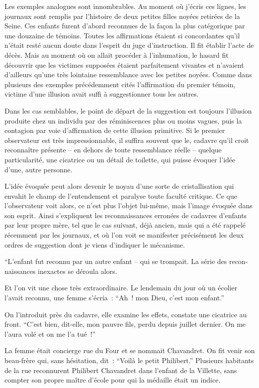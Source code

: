 \documentclass[french,twoside]{book} %
\begin{document}
Les exemples analogues sont innombrables. Au moment où j’écris ces lignes, les journaux sont remplis par l’histoire de deux petites filles noyées retirées de la Seine. Ces enfants furent d’abord reconnues de la façon la plus catégorique par une douzaine de témoins. Toutes les affirmations étaient si concordantes qu’il n’était resté aucun doute dans l’esprit du juge d’instruction. Il fit établir l’acte de décès. Mais au moment où on allait procéder à l’inhumation, le hasard fit découvrir que les victimes suppo­sées étaient parfaitement vivantes et n’avaient d’ailleurs qu’une très lointaine ressem­blance avec les petites noyées. Comme dans plusieurs des exemples précédemment cités l’affirmation du premier témoin, victime d’une illusion avait suffi à suggestion­ner tous les autres.\par
Dans les cas semblables, le point de départ de la suggestion est toujours l’illusion produite chez un individu par des réminiscences plus ou moins vagues, puis la contagion par voie d’affirmation de cette illusion primitive. Si le premier observateur est très impressionnable, il suffira souvent que le, cadavre qu’il croit reconnaître présente – en dehors de toute ressemblance réelle – quelque particularité, une cica­trice ou un détail de toilette, qui puisse évoquer l’idée d’une, autre personne.\par
L’idée évoquée peut alors devenir le noyau d’une sorte de cristallisation qui envahit le champ de l’entendement et paralyse toute faculté critique. Ce que l’observa­teur voit alors, ce n’est plus l’objet lui-même, mais l’image évoquée dans son esprit. Ainsi s’expliquent les reconnaissances erronées de cadavres d’enfants par leur propre mère, tel que le cas suivant, déjà ancien, mais qui a été rappelé récemment par les journaux, et où l’on voit se manifester précisément les deux ordres de suggestion dont je viens d’indiquer le mécanisme.\par
“L’enfant fut reconnu par un autre enfant – qui se trompait. La série des recon­naissances inexactes se déroula alors.\par
Et l’on vit une chose très extraordinaire. Le lendemain du jour où un écolier l’avait reconnu, une femme s’écria : “Ah ! mon Dieu, c’est mon enfant.”\par
On l’introduit près du cadavre, elle examine les effets, constate une cicatrice au front. “C’est bien, dit-elle, mon pauvre fils, perdu depuis juillet dernier. On me l’aura volé et on me l’a tué !”\par
La femme était concierge rue du Four et se nommait Chavandret. On fit venir son beau-frère qui, sans hésitation, dit : “Voilà le petit Philibert.” Plusieurs habitants de la rue reconnurent Philibert Chavandret dans l’enfant de la Villette, sans compter son propre maître d’école pour qui la médaille était un indice.\par
\end{document}

